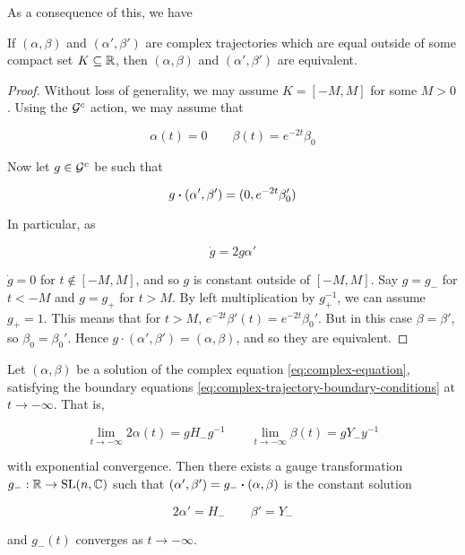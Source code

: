 \documentclass{report}
\begin{document}
As a consequence of this, we have

\begin{lemma}
    \label{lem:complex-trajectory-equal}

    If \((\alpha, \beta)\) and \((\alpha', \beta')\) are complex trajectories which are equal outside of some compact set \(K \subseteq \mathbb{R}\), then \((\alpha, \beta)\) and \((\alpha', \beta')\) are equivalent.
\end{lemma}

\begin{proof}
    Without loss of generality, we may assume \(K = [-M, M]\) for some \(M > 0\). Using the \(\mathcal{G}^c\) action, we may assume that

    \[\alpha(t) = 0 \qquad \beta(t) = e^{-2t}\beta_0\]

    Now let \(g \in \mathcal{G}^c\) be such that

    \[g \vdot (\alpha', \beta') = (0, e^{-2t}\beta_0')\]

    In particular, as

    \[\dot g = 2g\alpha'\]

    \(\dot g = 0\) for \(t \notin [-M, M]\), and so \(g\) is constant outside of \([-M, M]\). Say \(g = g_-\) for \(t < -M\) and \(g = g_+\) for \(t > M\). By left multiplication by \(g_+^{-1}\), we can assume \(g_+ = 1\). This means that for \(t > M\), \(e^{-2t}\beta'(t) = e^{-2t}\beta_0'\). But in this case \(\beta = \beta'\), so \(\beta_0 = \beta_0'\). Hence \(g \cdot (\alpha', \beta') = (\alpha, \beta)\), and so they are equivalent.
\end{proof}

\begin{lemma}
    \label{lem:complex-trajectory-convergence-negative}

    Let \((\alpha, \beta)\) be a solution of the complex equation \cref{eq:complex-equation}, satisfying the boundary equations \cref{eq:complex-trajectory-boundary-conditions} at \(t \to -\infty\). That is,

    \[\lim_{t\to-\infty}2\alpha(t) = gH_-g^{-1} \qquad \lim_{t \to -\infty}\beta(t) = gY_-y^{-1}\]

    with exponential convergence. Then there exists a gauge transformation \(g_- : \mathbb{R} \to \operatorname{SL}(n, \mathbb{C})\) such that \((\alpha', \beta') = g_-\vdot(\alpha, \beta)\) is the constant solution

    \[2\alpha' = H_- \qquad \beta' = Y_-\]

    and \(g_-(t)\) converges as \(t \to -\infty\).
\end{lemma}
\end{document}

